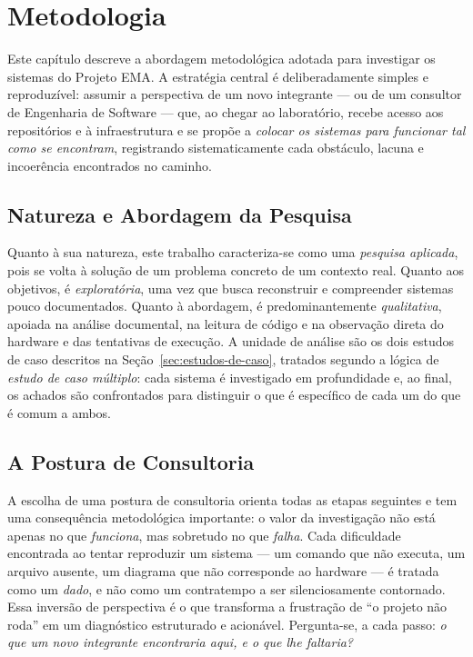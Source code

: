\chapter{Metodologia}
\label{cap:metodologia}

Este capítulo descreve a abordagem metodológica adotada para investigar os sistemas do
Projeto EMA. A estratégia central é deliberadamente simples e reproduzível: assumir a
perspectiva de um novo integrante --- ou de um consultor de Engenharia de Software --- que,
ao chegar ao laboratório, recebe acesso aos repositórios e à infraestrutura e se propõe a
\emph{colocar os sistemas para funcionar tal como se encontram}, registrando
sistematicamente cada obstáculo, lacuna e incoerência encontrados no caminho.

\section{Natureza e Abordagem da Pesquisa}

Quanto à sua natureza, este trabalho caracteriza-se como uma \emph{pesquisa aplicada}, pois
se volta à solução de um problema concreto de um contexto real. Quanto aos objetivos, é
\emph{exploratória}, uma vez que busca reconstruir e compreender sistemas pouco
documentados. Quanto à abordagem, é predominantemente \emph{qualitativa}, apoiada na análise
documental, na leitura de código e na observação direta do hardware e das tentativas de
execução. A unidade de análise são os dois estudos de caso descritos na
Seção~\ref{sec:estudos-de-caso}, tratados segundo a lógica de \emph{estudo de caso múltiplo}:
cada sistema é investigado em profundidade e, ao final, os achados são confrontados para
distinguir o que é específico de cada um do que é comum a ambos.

\section{A Postura de Consultoria}

A escolha de uma postura de consultoria orienta todas as etapas seguintes e tem uma
consequência metodológica importante: o valor da investigação não está apenas no que
\emph{funciona}, mas sobretudo no que \emph{falha}. Cada dificuldade encontrada ao tentar
reproduzir um sistema --- um comando que não executa, um arquivo ausente, um diagrama que
não corresponde ao hardware --- é tratada como um \emph{dado}, e não como um contratempo a
ser silenciosamente contornado. Essa inversão de perspectiva é o que transforma a
frustração de ``o projeto não roda'' em um diagnóstico estruturado e acionável. Pergunta-se,
a cada passo: \emph{o que um novo integrante encontraria aqui, e o que lhe faltaria?}

